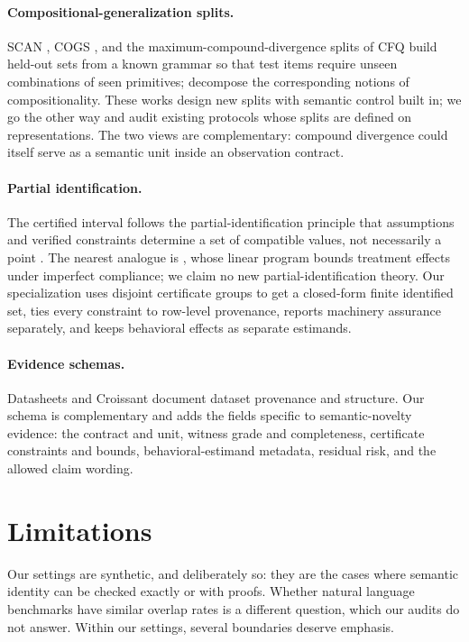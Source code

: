 \documentclass[twoside,11pt]{article}
\begin{document}
\paragraph{Compositional-generalization splits.}
SCAN \citep{lake2018generalization}, COGS \citep{kim2020cogs}, and the
maximum-compound-divergence splits of CFQ \citep{keysers2020cfq} build
held-out sets from a known grammar so that test items require unseen
combinations of seen primitives; \citet{hupkes2020compositionality}
decompose the corresponding notions of compositionality.  These works
design new splits with semantic control built in; we go the other way and
audit existing protocols whose splits are defined on representations.  The
two views are complementary: compound divergence could itself serve as a
semantic unit inside an observation contract.

\paragraph{Partial identification.}
The certified interval follows the partial-identification principle that
assumptions and verified constraints determine a set of compatible values,
not necessarily a point \citep{tamer2010partial}.  The nearest analogue is
\citet{balke1997bounds}, whose linear program bounds treatment effects
under imperfect compliance; we claim no new partial-identification theory.
Our specialization uses disjoint certificate groups to get a closed-form
finite identified set, ties every constraint to row-level provenance,
reports machinery assurance separately, and keeps behavioral effects as
separate estimands.

\paragraph{Evidence schemas.}
Datasheets \citep{gebru2021datasheets} and Croissant
\citep{akhtar2024croissant} document dataset provenance and structure.  Our schema is complementary and adds the fields specific to
semantic-novelty evidence: the contract and unit, witness grade and
completeness, certificate constraints and bounds, behavioral-estimand
metadata, residual risk, and the allowed claim wording.

\section{Limitations}
\label{sec:limitations}

Our settings are synthetic, and deliberately so: they are the cases where
semantic identity can be checked exactly or with proofs.  Whether natural
language benchmarks have similar overlap rates is a different question,
which our audits do not answer.  Within our settings, several boundaries
deserve emphasis.
\end{document}

